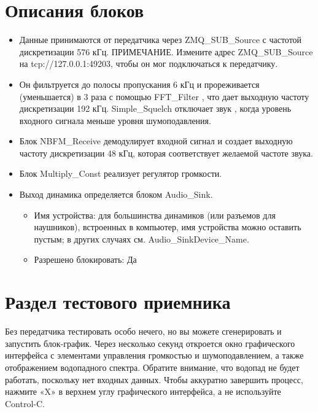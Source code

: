 \documentclass[12pt]{article}
\begin{document}
\section*{Описания блоков} 
\begin{flushleft}   
    

\begin{itemize}
    
    \item Данные принимаются от передатчика через ZMQ\_SUB\_Source с частотой дискретизации 576 кГц. ПРИМЕЧАНИЕ. Измените адрес ZMQ\_SUB\_Source на tcp://127.0.0.1:49203, чтобы он мог подключаться к передатчику.
    \item Он фильтруется до полосы пропускания 6 кГц и прореживается (уменьшается) в 3 раза с помощью FFT\_Filter , что дает выходную частоту дискретизации 192 кГц.
    Simple\_Squelch отключает звук , когда уровень входного сигнала меньше уровня шумоподавления.
    \item Блок NBFM\_Receive демодулирует входной сигнал и создает выходную частоту дискретизации 48 кГц, которая соответствует желаемой частоте звука.
    \item Блок Multiply\_Const реализует регулятор громкости.
    \item Выход динамика определяется блоком Audio\_Sink.
    \begin{itemize}
        \item Имя устройства: для большинства динамиков (или разъемов для наушников), встроенных в компьютер, имя устройства можно оставить пустым; в других случаях см. Audio\_SinkDevice\_Name.
        \item Разрешено блокировать: Да
    \end{itemize}

        
  \end{itemize}
\end{flushleft}
\section*{Раздел тестового приемника} 
Без передатчика тестировать особо нечего, но вы можете сгенерировать и запустить блок-график. Через несколько секунд откроется окно графического интерфейса с элементами управления громкостью и шумоподавлением, а также отображением водопадного спектра. Обратите внимание, что водопад не будет работать, поскольку нет входных данных. Чтобы аккуратно завершить процесс, нажмите «X» в верхнем углу графического интерфейса, а не используйте Control-C.
\end{document}
